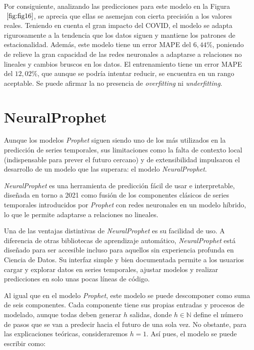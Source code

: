 \documentclass[12pt,twoside]{article}
\begin{document}
Por consiguiente, analizando las predicciones para este modelo en la Figura $~\ref{fig:fig16}$, se aprecia que ellas se asemejan con cierta precisión a los valores reales. Teniendo en cuenta el gran impacto del COVID, el modelo se adapta rigurosamente a la tendencia que los datos siguen y mantiene los patrones de estacionalidad. Además, este modelo tiene un error MAPE del $6,44\%$, poniendo de relieve la gran capacidad de las redes neuronales a adaptarse a relaciones no lineales y cambios bruscos en los datos. El entrenamiento tiene un error MAPE del $12,02\%$, que aunque se podría intentar reducir, se encuentra en un rango aceptable. Se puede afirmar la no presencia de \textit{overfitting} ni \textit{underfitting}.

\newpage

\section{NeuralProphet}\label{sec:21}

Aunque los modelos \textit{Prophet} siguen siendo uno de los más utilizados en la predicción de series temporales, sus limitaciones como la falta de contexto local (indispensable para prever el futuro cercano) y de extensibilidad impulsaron el desarrollo de un modelo que las superara: el modelo \textit{NeuralProphet}. 

\textit{NeuralProphet} \cite{np1} es una herramienta de predicción fácil de usar e interpretable, diseñada en torno a 2021 como fusión de los componentes clásicos de series temporales introducidos por \textit{Prophet} con redes neuronales en un modelo híbrido, lo que le permite adaptarse a relaciones no lineales. 

Una de las ventajas distintivas de \textit{NeuralProphet} es su facilidad de uso. A diferencia de otras bibliotecas de aprendizaje automático, \textit{NeuralProphet} está diseñado para ser accesible incluso para aquellos sin experiencia profunda en Ciencia de Datos. Su interfaz simple y bien documentada permite a los usuarios cargar y explorar datos en series temporales, ajustar modelos y realizar predicciones en solo unas pocas líneas de código.

Al igual que en el modelo \textit{Prophet}, este modelo se puede descomponer como suma de seis componentes. Cada componente tiene sus propias entradas y procesos de modelado, aunque todas deben generar $h$ salidas, donde $h \in \mathbb{N}$ define el número de pasos que se van a predecir hacia el futuro de una sola vez. No obstante, para las explicaciones teóricas, consideraremos $h=1$. Así pues, el modelo se puede escribir como: 
\end{document}
